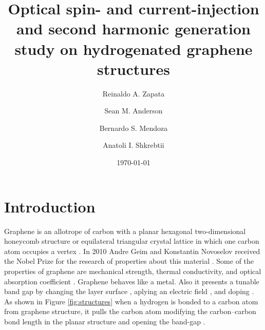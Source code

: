 \documentclass[twocolumn,aps,pra,11pt,tightenlines,showpacs,superscriptaddress,groupedaddress]{revtex4-1}
\begin{document}
\title{Optical spin- and current-injection and second harmonic generation study on hydrogenated graphene structures}

\author{Reinaldo A. Zapata}
\author{Sean M. Anderson}
\author{Bernardo S. Mendoza}
\author{Anatoli I. Shkrebtii}

\date{\today}

\begin{abstract}
\blindtext
\end{abstract}

\maketitle


\section{Introduction}\label{sec:intro}


Graphene is an allotrope of carbon with a planar hexagonal two-dimensional honeycomb structure or equilateral triangular crystal lattice in which one carbon atom occupies a vertex \cite{geim2007rise}. In 2010 Andre Geim and Konstantin Novoselov received the Nobel Prize for the research of properties about this material \cite{geim2007rise}. Some of the properties of graphene are mechanical strength, thermal conductivity, and optical absorption coefficient \cite{geim2007rise, nair2008fine}. Graphene behaves like a metal\cite{geim2007rise}. Also it presents a tunable band gap by changing the layer surface \cite{han2007energy}, aplying an electric field \cite{zhang2009direct},  and doping \cite{ohta2006controlling, elias2009control,guisinger2009exposure,samarakoon2010tunable}. As shown in Figure \ref{fig:structures} when a hydrogen is bonded to a carbon atom from graphene structure, it pulls the carbon atom modifying the carbon--carbon bond length in the planar structure and opening the band-gap \cite{samarakoon2010tunable}.
\end{document}
